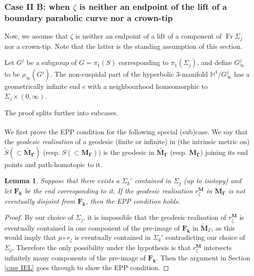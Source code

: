 \documentclass{amsart}
\newtheorem{lemma}[theorem]{Lemma}
\theoremstyle{definition}
\newcommand{\Fr}{\operatorname{Fr}}
\newcommand{\G}{{\Gamma}}
\newcommand\HHH{{\mathbb H}}
\newcommand\til{\widetilde}
\begin{document}
\subsubsection{Case II B: when $\zeta$ is neither an endpoint of the lift of a boundary parabolic curve nor a crown-tip}
Now,  we assume that $\zeta$ is neither an endpoint of a lift of a component of $\Fr \Sigma_j$ nor a crown-tip. Note that the latter is the standing assumption of this section.

Let $G^j$ be a subgroup of $G=\pi_1(S)$ corresponding to $\pi_1(\Sigma_j)$, and define $G_\infty^j$ to be $\rho_\infty(G^j)$.
The non-cuspidal part of the  hyperbolic 3-manifold $\HHH^3/G^j_\infty$ has a geometrically infinite end $e$ with a neighbourhood homeomorphic to $\Sigma_j \times (0,\infty)$.

The proof splits further into subcases.\\

\\
We first prove the EPP condition for  the following special (sub)case. 
We say that the {\em geodesic realisation} of a geodesic (finite or infinite) in (the intrinsic metric on) $\til{S} (\subset \til{\mathbf{M_\G}})$ (resp. ${S} (\subset {\mathbf{M_\G}})$) is the geodesic in $\til{\mathbf{M_\G}}$ (resp. ${\mathbf{M_\G}}$) joining its end points  and path-homotopic to it. 

\begin{lemma}
\label{no smaller surface}
Suppose that there exists a $\Sigma_k'$   contained in $\Sigma_j$ (up to isotopy) and let $\mathbf{F_k}$ be the end corresponding to it.
If the geodesic  realisation $r_\zeta^{\mathbf M}$ in $\mathbf{M_\G}$ is not eventually disjoint from $\mathbf{F_k}$, then the EPP condition holds.
\end{lemma}
\begin{proof}
By our choice of $\Sigma_j$, it is impossible that the geodesic realisation of $r^{\mathbf M}_\zeta$ is eventually contained in one component of the pre-image of $\mathbf{F_k}$ in $\widetilde{\mathbf M}_\Gamma$, as this would imply that $p \circ r_\zeta$ is eventually contained in $\Sigma_k'$ contradicting our choice of $\Sigma_j$.
Therefore the only possibility under the hypothesis is that $r_\zeta^{\mathbf M}$ intersects infinitely many components of the pre-image of $\mathbf{F_k}$.
Then the argument  in Section \ref{case IEL} goes through to show the EPP condition.
\end{proof}
\end{document}
